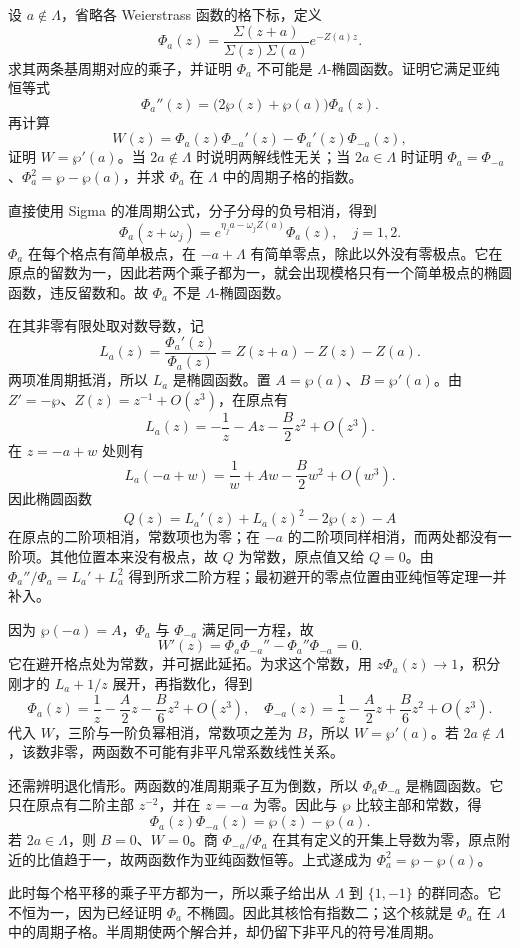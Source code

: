 \begin{exercise}[一个二阶方程的准周期解]\label{b3:ex:22-8}
设 \(a\notin\Lambda\)，省略各 Weierstrass 函数的格下标，定义
\[
 \Phi_a(z)=\frac{\Sigma(z+a)}{\Sigma(z)\Sigma(a)}e^{-Z(a)z}.
\]
求其两条基周期对应的乘子，并证明 \(\Phi_a\) 不可能是 \(\Lambda\)-椭圆函数。证明它满足亚纯恒等式
\[
 \Phi_a''(z)=\bigl(2\wp(z)+\wp(a)\bigr)\Phi_a(z).
\]
再计算
\[
 W(z)=\Phi_a(z)\Phi_{-a}'(z)-\Phi_a'(z)\Phi_{-a}(z),
\]
证明 \(W=\wp'(a)\)。当 \(2a\notin\Lambda\) 时说明两解线性无关；当 \(2a\in\Lambda\) 时证明
\(\Phi_a=\Phi_{-a}\)、\(\Phi_a^2=\wp-\wp(a)\)，并求 \(\Phi_a\) 在 \(\Lambda\) 中的周期子格的指数。
\end{exercise}
\begin{solution}
直接使用 Sigma 的准周期公式，分子分母的负号相消，得到
\[
 \Phi_a(z+\omega_j)
 =e^{\eta_j a-\omega_j Z(a)}\Phi_a(z),\quad j=1,2.
\]
\(\Phi_a\) 在每个格点有简单极点，在 \(-a+\Lambda\) 有简单零点，除此以外没有零极点。它在原点的留数为一，因此若两个乘子都为一，就会出现模格只有一个简单极点的椭圆函数，违反留数和。故 \(\Phi_a\) 不是 \(\Lambda\)-椭圆函数。

在其非零有限处取对数导数，记
\[
 L_a(z)=\frac{\Phi_a'(z)}{\Phi_a(z)}
       =Z(z+a)-Z(z)-Z(a).
\]
两项准周期抵消，所以 \(L_a\) 是椭圆函数。置 \(A=\wp(a)\)、\(B=\wp'(a)\)。由 \(Z'=-\wp\)、\(Z(z)=z^{-1}+O(z^3)\)，在原点有
\[
 L_a(z)=-\frac1z-Az-\frac B2z^2+O(z^3).
\]
在 \(z=-a+w\) 处则有
\[
 L_a(-a+w)=\frac1w+Aw-\frac B2w^2+O(w^3).
\]
因此椭圆函数
\[
 Q(z)=L_a'(z)+L_a(z)^2-2\wp(z)-A
\]
在原点的二阶项相消，常数项也为零；在 \(-a\) 的二阶项同样相消，而两处都没有一阶项。其他位置本来没有极点，故 \(Q\) 为常数，原点值又给 \(Q=0\)。由
\(\Phi_a''/\Phi_a=L_a'+L_a^2\) 得到所求二阶方程；最初避开的零点位置由亚纯恒等定理一并补入。

因为 \(\wp(-a)=A\)，\(\Phi_a\) 与 \(\Phi_{-a}\) 满足同一方程，故
\[
 W'(z)=\Phi_a\Phi_{-a}''-\Phi_a''\Phi_{-a}=0.
\]
它在避开格点处为常数，并可据此延拓。为求这个常数，用 \(z\Phi_a(z)\to1\)，积分刚才的 \(L_a+1/z\) 展开，再指数化，得到
\[
 \Phi_a(z)=\frac1z-\frac A2z-\frac B6z^2+O(z^3),\quad
 \Phi_{-a}(z)=\frac1z-\frac A2z+\frac B6z^2+O(z^3).
\]
代入 \(W\)，三阶与一阶负幂相消，常数项之差为 \(B\)，所以 \(W=\wp'(a)\)。若 \(2a\notin\Lambda\)，该数非零，两函数不可能有非平凡常系数线性关系。

还需辨明退化情形。两函数的准周期乘子互为倒数，所以 \(\Phi_a\Phi_{-a}\) 是椭圆函数。它只在原点有二阶主部 \(z^{-2}\)，并在 \(z=-a\) 为零。因此与 \(\wp\) 比较主部和常数，得
\[
 \Phi_a(z)\Phi_{-a}(z)=\wp(z)-\wp(a).
\]
若 \(2a\in\Lambda\)，则 \(B=0\)、\(W=0\)。商 \(\Phi_{-a}/\Phi_a\) 在其有定义的开集上导数为零，原点附近的比值趋于一，故两函数作为亚纯函数恒等。上式遂成为 \(\Phi_a^2=\wp-\wp(a)\)。

此时每个格平移的乘子平方都为一，所以乘子给出从 \(\Lambda\) 到 \(\{1,-1\}\) 的群同态。它不恒为一，因为已经证明 \(\Phi_a\) 不椭圆。因此其核恰有指数二；这个核就是 \(\Phi_a\) 在 \(\Lambda\) 中的周期子格。半周期使两个解合并，却仍留下非平凡的符号准周期。
\end{solution}
